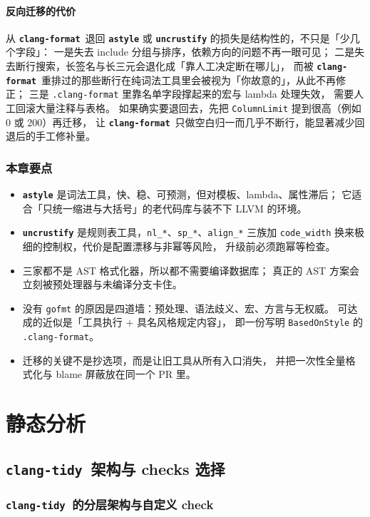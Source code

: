 \documentclass[12pt,a4paper,fontset=fandol]{ctexbook}
\newcommand{\Lib}[1]{\textbf{\texttt{#1}}}
\newcommand{\Tidy}{\Lib{clang-tidy}}
\newcommand{\Fmt}{\Lib{clang-format}}
\begin{document}
\subsection{反向迁移的代价}\label{sec:ch11-s6-reverse}

从 \Fmt\ 退回 \Lib{astyle} 或 \Lib{uncrustify} 的损失是结构性的，不只是「少几个字段」：
一是失去 include 分组与排序，依赖方向的问题不再一眼可见；
二是失去断行搜索，长签名与长三元会退化成「靠人工决定断在哪儿」，
而被 \Fmt\ 重排过的那些断行在纯词法工具里会被视为「你故意的」，从此不再修正；
三是 \texttt{.clang-format} 里靠名单字段撑起来的宏与 lambda 处理失效，
需要人工回滚大量注释与表格。
如果确实要退回去，先把 \texttt{ColumnLimit} 提到很高（例如 0 或 200）再迁移，
让 \Fmt\ 只做空白归一而几乎不断行，能显著减少回退后的手工修补量。

\section*{本章要点}
\begin{itemize}
  \item \Lib{astyle} 是词法工具，快、稳、可预测，但对模板、lambda、属性滞后；
    它适合「只统一缩进与大括号」的老代码库与装不下 LLVM 的环境。
  \item \Lib{uncrustify} 是规则表工具，\texttt{nl\_*}、\texttt{sp\_*}、\texttt{align\_*}
    三族加 \texttt{code\_width} 换来极细的控制权，代价是配置漂移与非幂等风险，
    升级前必须跑幂等检查。
  \item 三家都不是 AST 格式化器，所以都不需要编译数据库；
    真正的 AST 方案会立刻被预处理器与未编译分支卡住。
  \item 没有 \texttt{gofmt} 的原因是四道墙：预处理、语法歧义、宏、方言与无权威。
    可达成的近似是「工具执行 + 具名风格规定内容」，
    即一份写明 \texttt{BasedOnStyle} 的 \texttt{.clang-format}。
  \item 迁移的关键不是抄选项，而是让旧工具从所有入口消失，
    并把一次性全量格式化与 blame 屏蔽放在同一个 PR 里。
\end{itemize}

\part{静态分析}
\chapter{\Tidy\ 架构与 checks 选择}\label{ch:tidy-arch}
\section{\Tidy\ 的分层架构与自定义 check}\label{sec:ch12-s1}
\end{document}
